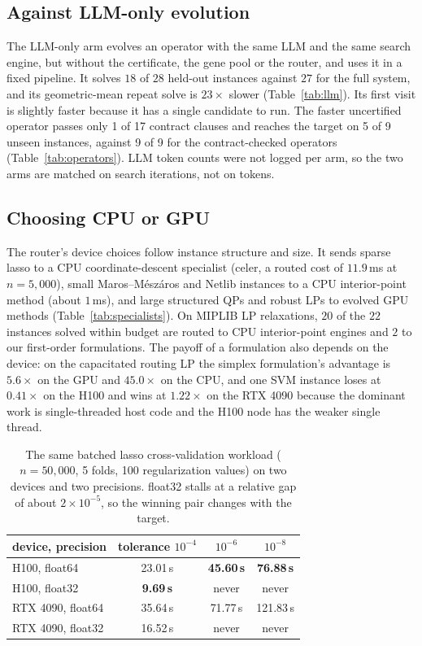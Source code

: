 \subsection{Against LLM-only evolution}



The LLM-only arm evolves an operator with the same LLM and the same search
engine, but without the certificate, the gene pool or the router, and uses it in a
fixed pipeline. It solves $18$ of $28$ held-out instances against $27$ for the
full system, and its geometric-mean repeat solve is $23\times$ slower
(Table~\ref{tab:llm}). Its first visit is slightly faster because it has a
single candidate to run. The faster uncertified operator passes only 1 of 17
contract clauses and reaches the target on 5 of 9 unseen instances, against 9
of 9 for the contract-checked operators (Table~\ref{tab:operators}). LLM token
counts were not logged per arm, so the two arms are matched on search
iterations, not on tokens.

\subsection{Choosing CPU or GPU}

The router's device choices follow instance structure and size. It sends
sparse lasso to a CPU coordinate-descent specialist (celer, a routed cost of
$11.9$\,ms at $n = 5{,}000$), small Maros--M\'esz\'aros and Netlib instances to
a CPU interior-point method (about $1$\,ms), and large structured QPs and robust
LPs to evolved GPU methods (Table~\ref{tab:specialists}). On MIPLIB LP
relaxations, $20$ of the $22$ instances solved within budget are routed to CPU
interior-point engines and $2$ to our first-order formulations. The
payoff of a formulation also depends on the device: on the capacitated routing
LP the simplex formulation's advantage is $5.6\times$ on the GPU and $45.0\times$
on the CPU, and one SVM instance loses at $0.41\times$ on the H100 and wins at
$1.22\times$ on the RTX 4090 because the dominant work is single-threaded host
code and the H100 node has the weaker single thread.

\begin{table}[t]
\centering
\small
\begin{tabular}{lccc}
\toprule
device, precision & tolerance $10^{-4}$ & $10^{-6}$ & $10^{-8}$ \\
\midrule
H100, float64 & 23.01\,s & \textbf{45.60\,s} & \textbf{76.88\,s} \\
H100, float32 & \textbf{9.69\,s} & never & never \\
RTX 4090, float64 & 35.64\,s & 71.77\,s & 121.83\,s \\
RTX 4090, float32 & 16.52\,s & never & never \\
\bottomrule
\end{tabular}
\caption{The same batched lasso cross-validation workload ($n = 50{,}000$, 5
folds, 100 regularization values) on two devices and two precisions. float32
stalls at a relative gap of about $2\times10^{-5}$, so the winning pair changes
with the target.}
\label{tab:device}
\end{table}

